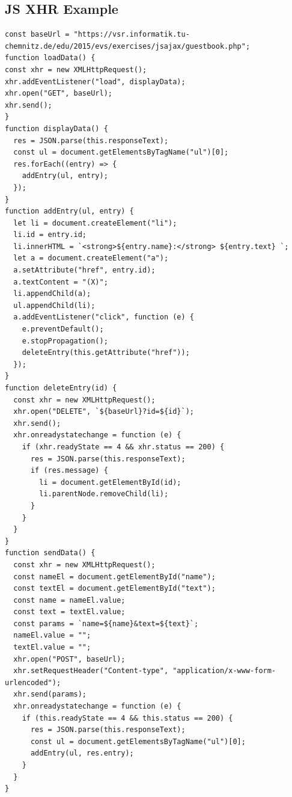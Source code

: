 \documentclass[11pt]{article}
\begin{document}
\subsection{JS XHR Example}
\label{sec:org9615dad}
\begin{verbatim}
const baseUrl = "https://vsr.informatik.tu-chemnitz.de/edu/2015/evs/exercises/jsajax/guestbook.php";
function loadData() {
const xhr = new XMLHttpRequest();
xhr.addEventListener("load", displayData);
xhr.open("GET", baseUrl);
xhr.send();
}
function displayData() {
  res = JSON.parse(this.responseText);
  const ul = document.getElementsByTagName("ul")[0];
  res.forEach((entry) => {
    addEntry(ul, entry);
  });
}
function addEntry(ul, entry) {
  let li = document.createElement("li");
  li.id = entry.id;
  li.innerHTML = `<strong>${entry.name}:</strong> ${entry.text} `;
  let a = document.createElement("a");
  a.setAttribute("href", entry.id);
  a.textContent = "(X)";
  li.appendChild(a);
  ul.appendChild(li);
  a.addEventListener("click", function (e) {
    e.preventDefault();
    e.stopPropagation();
    deleteEntry(this.getAttribute("href"));
  });
}
function deleteEntry(id) {
  const xhr = new XMLHttpRequest();
  xhr.open("DELETE", `${baseUrl}?id=${id}`);
  xhr.send();
  xhr.onreadystatechange = function (e) {
    if (xhr.readyState == 4 && xhr.status == 200) {
      res = JSON.parse(this.responseText);
      if (res.message) {
        li = document.getElementById(id);
        li.parentNode.removeChild(li);
      }
    }
  }
}
function sendData() {
  const xhr = new XMLHttpRequest();
  const nameEl = document.getElementById("name");
  const textEl = document.getElementById("text");
  const name = nameEl.value;
  const text = textEl.value;
  const params = `name=${name}&text=${text}`;
  nameEl.value = "";
  textEl.value = "";
  xhr.open("POST", baseUrl);
  xhr.setRequestHeader("Content-type", "application/x-www-form-urlencoded");
  xhr.send(params);
  xhr.onreadystatechange = function (e) {
    if (this.readyState == 4 && this.status == 200) {
      res = JSON.parse(this.responseText);
      const ul = document.getElementsByTagName("ul")[0];
      addEntry(ul, res.entry);
    }
  }
}
\end{verbatim}
\end{document}
